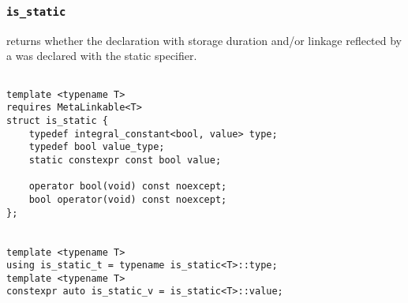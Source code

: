 
\subsubsection{\texttt{is\_static}}

returns whether the declaration with storage duration and/or linkage reflected by a  was declared with the static specifier.

\begin{verbatim}

template <typename T>
requires MetaLinkable<T>
struct is_static {
	typedef integral_constant<bool, value> type;
	typedef bool value_type;
	static constexpr const bool value;

	operator bool(void) const noexcept;
	bool operator(void) const noexcept;
};


template <typename T>
using is_static_t = typename is_static<T>::type;
template <typename T>
constexpr auto is_static_v = is_static<T>::value;

\end{verbatim}
